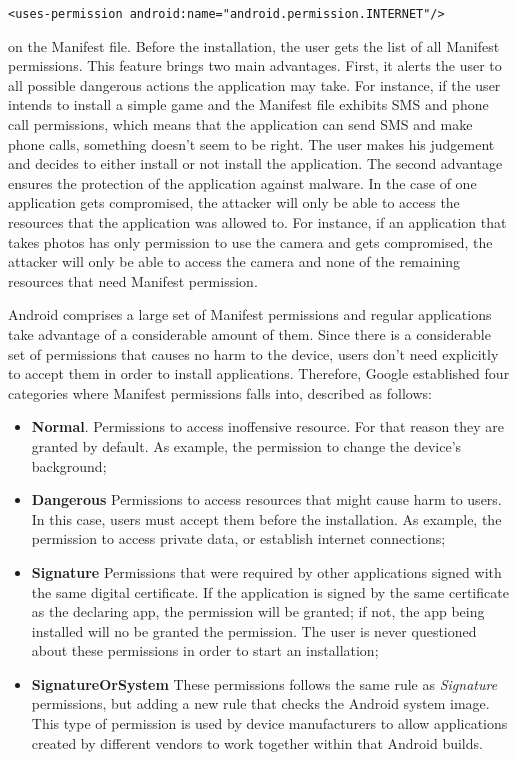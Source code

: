 \noindent \texttt{<uses-permission android:name="android.permission.INTERNET"/>}

\noindent on the Manifest file. Before the installation, the user gets the list of all Manifest permissions. This feature brings two main advantages. First, it alerts the user to all possible dangerous actions the application may take. For instance, if the user intends to install a simple game and the Manifest file exhibits SMS and phone call permissions, which means that the application can send SMS and make phone calls, something doesn't seem to be right. The user makes his judgement and decides to either install or not install the application. The second advantage ensures the protection of the application against malware. In the case of one application gets compromised, the attacker will only be able to access the resources that the application was allowed to. For instance, if an application that takes photos has only permission to use the camera and gets compromised, the attacker will only be able to access the camera and none of the remaining resources that need Manifest permission.


Android comprises a large set of Manifest permissions \cite{ManifestPermissions:Android} and regular applications take advantage of a considerable amount of them. Since there is a considerable set of permissions that causes no harm to the device, users don't need explicitly to accept them in order to install applications. Therefore, Google established four categories where Manifest permissions falls into, described as follows:

\begin{itemize}
 \item \textbf{Normal}. Permissions to access inoffensive resource. For that reason they are granted by default. As example, the permission to change the device's background;

 \item \textbf{Dangerous} Permissions to access resources that might cause harm to users. In this case, users must accept them before the installation. As example, the permission to access 
private data, or establish internet connections;

\item \textbf{Signature} Permissions that were required by other applications signed with the same digital certificate. If the application is signed by the same certificate as the declaring app, the permission will be granted; if not, the app being installed will no be granted the permission. The user is never questioned about these permissions in order to start an installation;

\item \textbf{SignatureOrSystem} These permissions follows the same rule as \textit{Signature} permissions, but adding a new rule that checks the Android system image. This type of permission is used by device manufacturers to allow applications created by different vendors to work together within that Android builds.
\end{itemize}


